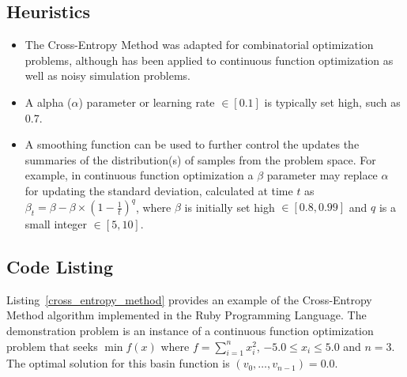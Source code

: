 \subsection{Heuristics}
\begin{itemize}
	\item The Cross-Entropy Method was adapted for combinatorial optimization problems, although has been applied to continuous function optimization as well as noisy simulation problems.
	\item A alpha ($\alpha$) parameter or learning rate $\in [0.1]$ is typically set high, such as 0.7.
	\item A smoothing function can be used to further control the updates the summaries of the distribution(s) of samples from the problem space. For example, in continuous function optimization a $\beta$ parameter may replace $\alpha$ for updating the standard deviation, calculated at time $t$ as $\beta_{t} = \beta - \beta \times (1-\frac{1}{t})^q$, where $\beta$ is initially set high $\in [0.8, 0.99]$ and $q$ is a small integer $\in [5, 10]$.
\end{itemize}

\subsection{Code Listing}
Listing~\ref{cross_entropy_method} provides an example of the Cross-Entropy Method algorithm implemented in the Ruby Programming Language. 
The demonstration problem is an instance of a continuous function optimization problem that seeks $\min f(x)$ where $f=\sum_{i=1}^n x_{i}^2$, $-5.0\leq x_i \leq 5.0$ and $n=3$. The optimal solution for this basin function is $(v_0,\ldots,v_{n-1})=0.0$.

